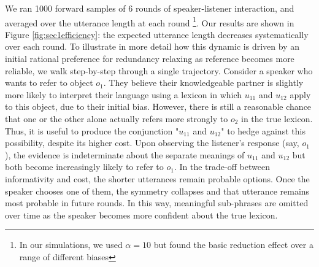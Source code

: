 We ran 1000 forward samples of 6 rounds of speaker-listener interaction, and averaged over the utterance length at each round \footnote{In our simulations, we used $\alpha = 10$ but found the basic reduction effect over a range of different biases}. 
Our results are shown in Figure \ref{fig:sec1efficiency}: the expected utterance length decreases systematically over each round. 
To illustrate in more detail how this dynamic is driven by an initial rational preference for redundancy relaxing as reference becomes more reliable, we walk step-by-step through a single trajectory. 
Consider a speaker who wants to refer to object $o_1$. 
They believe their knowledgeable partner is slightly more likely to interpret their language using a lexicon in which $u_{11}$ and $u_{12}$ apply to this object, due to their initial bias. 
However, there is still a reasonable chance that one or the other alone actually refers more strongly to $o_2$ in the true lexicon. 
Thus, it is useful to produce the conjunction "$u_{11}$ and $u_{12}$" to hedge against this possibility, despite its higher cost. 
Upon observing the listener's response (say, $o_1$), the evidence is indeterminate about the separate meanings of $u_{11}$ and $u_{12}$ but both become increasingly likely to refer to $o_1$. 
In the trade-off between informativity and cost, the shorter utterances remain probable options. 
Once the speaker chooses one of them, the symmetry collapses and that utterance remains most probable in future rounds. 
In this way, meaningful sub-phrases are omitted over time as the speaker becomes more confident about the true lexicon. 

%
%
%


